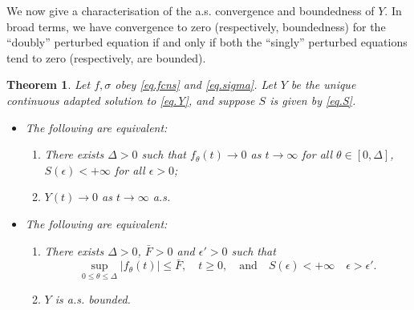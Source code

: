 \documentclass[a4paper,10pt,reqno]{amsart}
\numberwithin{equation}{section}
\newtheorem{theorem}{Theorem}
\theoremstyle{definition}
\theoremstyle{remark}
\DeclareMathOperator{\1}{\mathbbm 1}
\begin{document}
We now give a characterisation of the a.s. convergence and boundedness of $Y$. In broad terms, we have convergence to zero (respectively, boundedness) for the ``doubly'' perturbed equation if and only if both the ``singly''
perturbed equations tend to zero (respectively, are bounded).
\begin{theorem} \label{thm.Yto0bddchar}
Let $f,\sigma$ obey \eqref{eq.fcns} and \eqref{eq.sigma}. Let $Y$ be the unique continuous adapted solution to \eqref{eq.Y}, and suppose $S$ is given by \eqref{eq.S}. 
\begin{itemize}
	\item[(a)] The following are equivalent:
	\begin{enumerate}
		\item[(A)] There exists $\Delta>0$ such that $f_\theta(t) \to 0$ as $t\to\infty$ for all $\theta\in [0,\Delta]$, $S(\epsilon)<+\infty$ for all $\epsilon>0$;
		\item[(B)] $Y(t)\to 0$ as $t\to\infty$ a.s. 
	\end{enumerate}
	\item[(b)] The following are equivalent:
	\begin{enumerate}
		\item[(A)] There exists $\Delta>0$, $\bar{F}>0$ and $\epsilon'>0$ such that 
		\[
		\sup_{0\leq \theta\leq \Delta}|f_\theta(t)|\leq \bar{F}, \quad t\geq 0, \quad \text{and}\quad 
		S(\epsilon)<+\infty \quad \epsilon>\epsilon'.
		\]
		\item[(B)] $Y$ is a.s. bounded. 
	\end{enumerate}
\end{itemize} 
\end{theorem}
\end{document}
